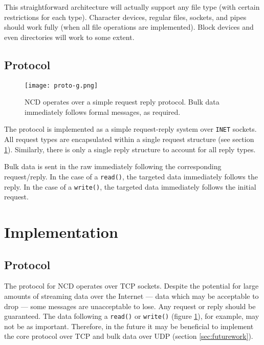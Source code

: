 \documentclass[11pt,twocolumn]{article}
\begin{document}
This straightforward architecture will actually support any file type
(with certain restrictions for each type). Character devices, regular
files, sockets, and pipes should work fully (when all file operations
are implemented). Block devices and even directories will work to some
extent.

\subsection{Protocol}

\begin{figure}[h]
  \centering
  \texttt{[image: proto-g.png]}
  \caption{NCD operates over a simple request reply protocol. Bulk data
    immediately follows formal messages, as required.}
  \label{fig:protocol}
\end{figure}

The protocol is implemented as a simple request-reply system over
\texttt{INET} sockets. All request types are encapsulated within a
single request structure (see section \ref{sec:implementation}).
Similarly, there is only a single reply structure to account for all
reply types.

Bulk data is sent in the raw immediately following the corresponding
request/reply. In the case of a \texttt{read()}, the targeted data
immediately follows the reply. In the case of a \texttt{write()}, the
targeted data immediately follows the initial request.

\section{Implementation}
\label{sec:implementation}

\subsection{Protocol}



The protocol for NCD operates over TCP sockets. Despite the potential
for large amounts of streaming data over the Internet --- data which may
be acceptable to drop --- some messages are unacceptable to lose. Any
request or reply should be guaranteed. The data following a
\texttt{read()} or \texttt{write()} (figure \ref{fig:protocol}), for
example, may not be as important. Therefore, in the future it may be
beneficial to implement the core protocol over TCP and bulk data over
UDP (section \ref{sec:futurework}).
\end{document}
